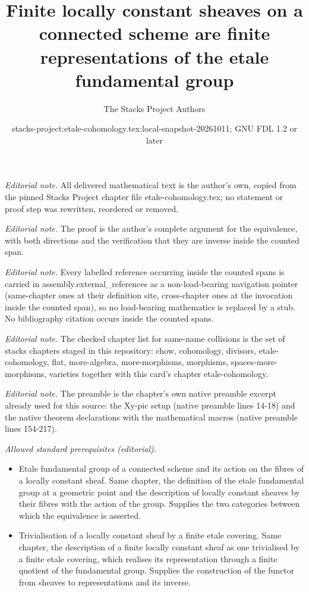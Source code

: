 \documentclass[10pt,a4paper]{amsart}
\title{Finite locally constant sheaves on a connected scheme are finite representations of the etale fundamental group}
\author{The Stacks Project Authors}
\date{stacks-project:etale-cohomology.tex:local-snapshot-20261011; GNU FDL 1.2 or later}
\theoremstyle{plain}
\theoremstyle{definition}
\theoremstyle{remark}
\numberwithin{equation}{subsection}
\begin{document}
\maketitle
\noindent\textit{Editorial note.} All delivered mathematical text is the author's own, copied from the pinned Stacks Project chapter file etale-cohomology.tex; no statement or proof step was rewritten, reordered or removed.\par\medskip
\noindent\textit{Editorial note.} The proof is the author's complete argument for the equivalence, with both directions and the verification that they are inverse inside the counted span.\par\medskip
\noindent\textit{Editorial note.} Every labelled reference occurring inside the counted spans is carried in assembly.external\_references as a non-load-bearing navigation pointer (same-chapter ones at their definition site, cross-chapter ones at the invocation inside the counted span), so no load-bearing mathematics is replaced by a stub. No bibliography citation occurs inside the counted spans.\par\medskip
\noindent\textit{Editorial note.} The checked chapter list for same-name collisions is the set of stacks chapters staged in this repository: chow, cohomology, divisors, etale-cohomology, flat, more-algebra, more-morphisms, morphisms, spaces-more-morphisms, varieties together with this card's chapter etale-cohomology.\par\medskip
\noindent\textit{Editorial note.} The preamble is the chapter's own native preamble excerpt already used for this source: the Xy-pic setup (native preamble lines 14-18) and the native theorem declarations with the mathematical macros (native preamble lines 154-217).\par\medskip
\noindent\textit{Allowed standard prerequisites (editorial).}\begin{itemize}
\item Etale fundamental group of a connected scheme and its action on the fibres of a locally constant sheaf. Same chapter, the definition of the etale fundamental group at a geometric point and the description of locally constant sheaves by their fibres with the action of the group. Supplies the two categories between which the equivalence is asserted.
\item Trivialisation of a locally constant sheaf by a finite etale covering. Same chapter, the description of a finite locally constant sheaf as one trivialised by a finite etale covering, which realises its representation through a finite quotient of the fundamental group. Supplies the construction of the functor from sheaves to representations and its inverse.
\end{itemize}\medskip
\end{document}
